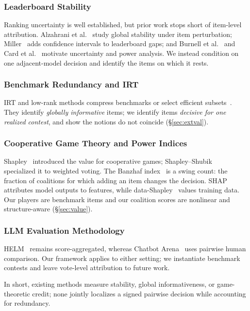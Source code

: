 \documentclass[conference]{IEEEtran}
\begin{document}
\subsubsection{Leaderboard Stability}
Ranking uncertainty is well established, but prior work stops short of item-level attribution.
Alzahrani et al.~\cite{alzahrani2024benchmarks} study global stability under item perturbation; Miller~\cite{miller2024adding} adds confidence intervals to leaderboard gaps; and Burnell et al.~\cite{burnell2023rethink} and Card et al.~\cite{card2020power} motivate uncertainty and power analysis.
We instead condition on one adjacent-model decision and identify the items on which it rests.

\subsubsection{Benchmark Redundancy and IRT}
IRT and low-rank methods compress benchmarks or select efficient subsets~\cite{kipnis2025metabench,polo2024tinybenchmarks,fromskills2024,perlitz2024efficient}.
They identify \emph{globally informative} items; we identify items \emph{decisive for one realized contest}, and show the notions do not coincide (\S\ref{sec:extval}).

\subsubsection{Cooperative Game Theory and Power Indices}
Shapley~\cite{shapley1953value} introduced the value for cooperative games; Shapley--Shubik~\cite{shapleyshubik1954} specialized it to weighted voting.
The Banzhaf index~\cite{banzhaf1965} is a swing count: the fraction of coalitions for which adding an item changes the decision.
SHAP~\cite{lundberg2017shap} attributes model outputs to features, while data-Shapley~\cite{ghorbani2019data,jia2019efficient} values training data.
Our players are benchmark items and our coalition scores are nonlinear and structure-aware (\S\ref{sec:value}).

\subsubsection{LLM Evaluation Methodology}
HELM~\cite{liang2023helm} remains score-aggregated, whereas Chatbot Arena~\cite{zheng2024chatbot} uses pairwise human comparison.
Our framework applies to either setting; we instantiate benchmark contests and leave vote-level attribution to future work.

In short, existing methods measure stability, global informativeness, or game-theoretic credit; none jointly localizes a signed pairwise decision while accounting for redundancy.
\end{document}
